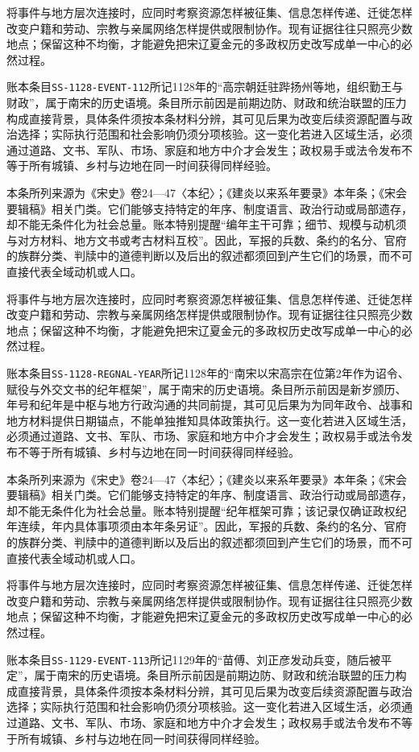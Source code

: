 将事件与地方层次连接时，应同时考察资源怎样被征集、信息怎样传递、迁徙怎样改变户籍和劳动、宗教与亲属网络怎样提供或限制协作。现有证据往往只照亮少数地点；保留这种不均衡，才能避免把宋辽夏金元的多政权历史改写成单一中心的必然过程。

账本条目\texttt{SS-1128-EVENT-112}所记1128年的“高宗朝廷驻跸扬州等地，组织勤王与财政”，属于南宋的历史语境。条目所示前因是前期边防、财政和统治联盟的压力构成直接背景，具体条件须按本条材料分辨，其可见后果为改变后续资源配置与政治选择；实际执行范围和社会影响仍须分项核验。这一变化若进入区域生活，必须通过道路、文书、军队、市场、家庭和地方中介才会发生；政权易手或法令发布不等于所有城镇、乡村与边地在同一时间获得同样经验。

本条所列来源为《宋史》卷24—47〈本纪〉；《建炎以来系年要录》本年条；《宋会要辑稿》相关门类。它们能够支持特定的年序、制度语言、政治行动或局部遗存，却不能无条件化为社会总量。账本特别提醒“编年主干可靠；细节、规模与动机须与对方材料、地方文书或考古材料互校”。因此，军报的兵数、条约的名分、官府的族群分类、判牍中的道德判断以及后出的叙述都须回到产生它们的场景，而不可直接代表全域动机或人口。

将事件与地方层次连接时，应同时考察资源怎样被征集、信息怎样传递、迁徙怎样改变户籍和劳动、宗教与亲属网络怎样提供或限制协作。现有证据往往只照亮少数地点；保留这种不均衡，才能避免把宋辽夏金元的多政权历史改写成单一中心的必然过程。

账本条目\texttt{SS-1128-REGNAL-YEAR}所记1128年的“南宋以宋高宗在位第2年作为诏令、赋役与外交文书的纪年框架”，属于南宋的历史语境。条目所示前因是新岁颁历、年号和纪年是中枢与地方行政沟通的共同前提，其可见后果为为同年政令、战事和地方材料提供日期锚点，不能单独推知具体政策执行。这一变化若进入区域生活，必须通过道路、文书、军队、市场、家庭和地方中介才会发生；政权易手或法令发布不等于所有城镇、乡村与边地在同一时间获得同样经验。

本条所列来源为《宋史》卷24—47〈本纪〉；《建炎以来系年要录》本年条；《宋会要辑稿》相关门类。它们能够支持特定的年序、制度语言、政治行动或局部遗存，却不能无条件化为社会总量。账本特别提醒“纪年框架可靠；该记录仅确证政权纪年连续，年内具体事项须由本年条另证”。因此，军报的兵数、条约的名分、官府的族群分类、判牍中的道德判断以及后出的叙述都须回到产生它们的场景，而不可直接代表全域动机或人口。

将事件与地方层次连接时，应同时考察资源怎样被征集、信息怎样传递、迁徙怎样改变户籍和劳动、宗教与亲属网络怎样提供或限制协作。现有证据往往只照亮少数地点；保留这种不均衡，才能避免把宋辽夏金元的多政权历史改写成单一中心的必然过程。

账本条目\texttt{SS-1129-EVENT-113}所记1129年的“苗傅、刘正彦发动兵变，随后被平定”，属于南宋的历史语境。条目所示前因是前期边防、财政和统治联盟的压力构成直接背景，具体条件须按本条材料分辨，其可见后果为改变后续资源配置与政治选择；实际执行范围和社会影响仍须分项核验。这一变化若进入区域生活，必须通过道路、文书、军队、市场、家庭和地方中介才会发生；政权易手或法令发布不等于所有城镇、乡村与边地在同一时间获得同样经验。

